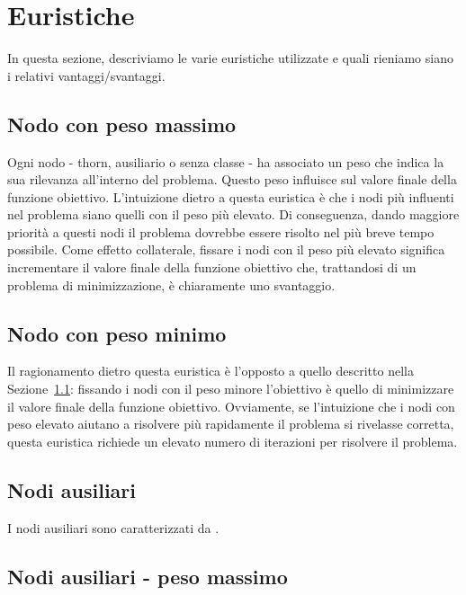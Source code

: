 \section{Euristiche}

In questa sezione, descriviamo le varie euristiche utilizzate e quali rieniamo siano i relativi vantaggi/svantaggi.

\subsection{Nodo con peso massimo}\label{subsec:nodo_peso_massimo}

Ogni nodo - thorn, ausiliario o senza classe - ha associato un peso che indica la sua rilevanza all'interno del problema. Questo peso influisce sul valore finale della funzione obiettivo. L'intuizione dietro a questa euristica è che i nodi più influenti nel problema siano quelli con il peso più elevato. Di conseguenza, dando maggiore priorità a questi nodi il problema dovrebbe essere risolto nel più breve tempo possibile. Come effetto collaterale, fissare i nodi con il peso più elevato significa incrementare il valore finale della funzione obiettivo che, trattandosi di un problema di minimizzazione, è chiaramente uno svantaggio.

\subsection{Nodo con peso minimo}\label{subsec:nodo_peso_minimo}

Il ragionamento dietro questa euristica è l'opposto a quello descritto nella Sezione~\ref{subsec:nodo_peso_massimo}: fissando i nodi con il peso minore l'obiettivo è quello di minimizzare il valore finale della funzione obiettivo. Ovviamente, se l'intuizione che i nodi con peso elevato aiutano a risolvere più rapidamente il problema si rivelasse corretta, questa euristica richiede un elevato numero di iterazioni per risolvere il problema.

\subsection{Nodi ausiliari}\label{subsec:nodi_ausiliari}

I nodi ausiliari sono caratterizzati da .

\subsection{Nodi ausiliari - peso massimo}

